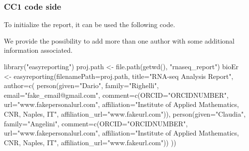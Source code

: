 \documentclass[
]{article}
\newenvironment{Shaded}{\begin{snugshade}}{\end{snugshade}}
\newcommand{\AttributeTok}[1]{\textcolor[rgb]{0.77,0.63,0.00}{#1}}
\newcommand{\FunctionTok}[1]{\textcolor[rgb]{0.00,0.00,0.00}{#1}}
\newcommand{\NormalTok}[1]{#1}
\newcommand{\OtherTok}[1]{\textcolor[rgb]{0.56,0.35,0.01}{#1}}
\newcommand{\StringTok}[1]{\textcolor[rgb]{0.31,0.60,0.02}{#1}}
\begin{document}
\hypertarget{cc1-code-side}{%
\subsubsection{CC1 code side}\label{cc1-code-side}}

To initialize the report, it can be used the following code.

We provide the possibility to add more than one author with some
additional information associated.

\begin{Shaded}
\begin{Highlighting}[]
\FunctionTok{library}\NormalTok{(}\StringTok{"easyreporting"}\NormalTok{)}
\NormalTok{proj.path }\OtherTok{\textless{}{-}} \FunctionTok{file.path}\NormalTok{(}\FunctionTok{getwd}\NormalTok{(), }\StringTok{"rnaseq\_report"}\NormalTok{)}
\NormalTok{bioEr }\OtherTok{\textless{}{-}} \FunctionTok{easyreporting}\NormalTok{(}\AttributeTok{filenamePath=}\NormalTok{proj.path, }\AttributeTok{title=}\StringTok{"RNA{-}seq Analysis Report"}\NormalTok{,}
                       \AttributeTok{author=}\FunctionTok{c}\NormalTok{(}
                           \FunctionTok{person}\NormalTok{(}\AttributeTok{given=}\StringTok{"Dario"}\NormalTok{, }\AttributeTok{family=}\StringTok{"Righelli"}\NormalTok{, }
                                  \AttributeTok{email=}\StringTok{"fake\_email@gmail.com"}\NormalTok{,}
                                  \AttributeTok{comment=}\FunctionTok{c}\NormalTok{(}\AttributeTok{ORCID=}\StringTok{"ORCIDNUMBER"}\NormalTok{, }
                                            \AttributeTok{url=}\StringTok{"www.fakepersonalurl.com"}\NormalTok{,}
                                            \AttributeTok{affiliation=}\StringTok{"Institute of Applied Mathematics, CNR, Naples, IT"}\NormalTok{, }
                                            \AttributeTok{affiliation\_url=}\StringTok{"www.fakeurl.com"}\NormalTok{)),}
                           \FunctionTok{person}\NormalTok{(}\AttributeTok{given=}\StringTok{"Claudia"}\NormalTok{, }\AttributeTok{family=}\StringTok{"Angelini"}\NormalTok{,}
                                  \AttributeTok{comment=}\FunctionTok{c}\NormalTok{(}\AttributeTok{ORCID=}\StringTok{"ORCIDNUMBER"}\NormalTok{,}
                                            \AttributeTok{url=}\StringTok{"www.fakepersonalurl.com"}\NormalTok{,}
                                            \AttributeTok{affiliation=}\StringTok{"Institute of Applied Mathematics, CNR, Naples, IT"}\NormalTok{,}
                                            \AttributeTok{affiliation\_url=}\StringTok{"www.fakeurl.com"}\NormalTok{))}
\NormalTok{                       ))}
\end{Highlighting}
\end{Shaded}
\end{document}
